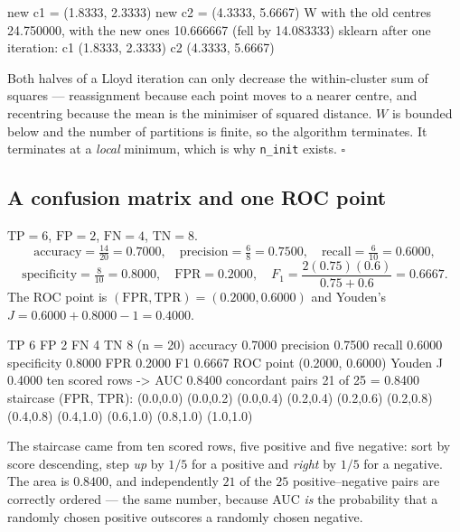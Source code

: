 \documentclass[11pt]{article}
\begin{document}
\begin{codeout}
new c1 = (1.8333, 2.3333)   new c2 = (4.3333, 5.6667)
W with the old centres 24.750000, with the new ones 10.666667
(fell by 14.083333)
sklearn after one iteration: c1 (1.8333, 2.3333)  c2 (4.3333, 5.6667)
\end{codeout}

Both halves of a Lloyd iteration can only decrease the within-cluster sum of
squares --- reassignment because each point moves to a nearer centre, and
recentring because the mean is the minimiser of squared distance. $W$ is
bounded below and the number of partitions is finite, so the algorithm
terminates. It terminates at a \emph{local} minimum, which is why
\texttt{n\_init} exists. \ensuremath{\square}

\subsection{A confusion matrix and one ROC point}

\begin{worked}
$\mathrm{TP} = 6$, $\mathrm{FP} = 2$, $\mathrm{FN} = 4$, $\mathrm{TN} = 8$.
\[
  \text{accuracy} = \tfrac{14}{20} = 0.7000, \quad
  \text{precision} = \tfrac{6}{8} = 0.7500, \quad
  \text{recall} = \tfrac{6}{10} = 0.6000,
\]
\[
  \text{specificity} = \tfrac{8}{10} = 0.8000, \quad
  \mathrm{FPR} = 0.2000, \quad
  F_1 = \frac{2(0.75)(0.6)}{0.75 + 0.6} = 0.6667 .
\]
The ROC point is $(\mathrm{FPR}, \mathrm{TPR}) = (0.2000, 0.6000)$ and
Youden's $J = 0.6000 + 0.8000 - 1 = 0.4000$.
\end{worked}

\begin{codeout}
TP 6  FP 2  FN 4  TN 8   (n = 20)
accuracy 0.7000  precision 0.7500  recall 0.6000  specificity 0.8000
FPR 0.2000   F1 0.6667   ROC point (0.2000, 0.6000)   Youden J 0.4000
ten scored rows -> AUC 0.8400
concordant pairs 21 of 25 = 0.8400
staircase (FPR, TPR):
  (0.0,0.0) (0.0,0.2) (0.0,0.4) (0.2,0.4) (0.2,0.6) (0.2,0.8)
  (0.4,0.8) (0.4,1.0) (0.6,1.0) (0.8,1.0) (1.0,1.0)
\end{codeout}

The staircase came from ten scored rows, five positive and five negative:
sort by score descending, step \emph{up} by $1/5$ for a positive and
\emph{right} by $1/5$ for a negative. The area is $0.8400$, and independently
$21$ of the $25$ positive--negative pairs are correctly ordered --- the same
number, because AUC \emph{is} the probability that a randomly chosen positive
outscores a randomly chosen negative.
\end{document}
